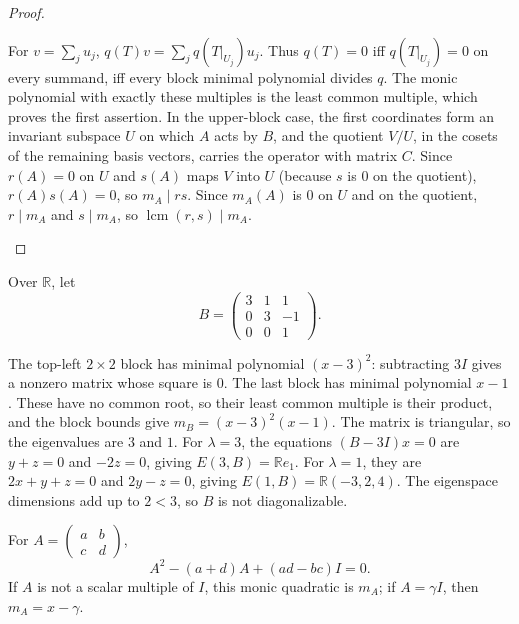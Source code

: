 \begin{prob}\begin{proof}\begin{steps}
\ii For $v=\sum_j u_j$, $q(T)v=\sum_j q(T|_{U_j})u_j$. Thus $q(T)=0$ iff $q(T|_{U_j})=0$ on every summand, iff every block minimal polynomial divides $q$. The monic polynomial with exactly these multiples is the least common multiple, which proves the first assertion.
\ii In the upper-block case, the first coordinates form an invariant subspace $U$ on which $A$ acts by $B$, and the quotient $V/U$, in the cosets of the remaining basis vectors, carries the operator with matrix $C$. Since $r(A)=0$ on $U$ and $s(A)$ maps $V$ into $U$ (because $s$ is $0$ on the quotient), $r(A)s(A)=0$, so $m_A\mid rs$. Since $m_A(A)$ is $0$ on $U$ and on the quotient, $r\mid m_A$ and $s\mid m_A$, so $\operatorname{lcm}(r,s)\mid m_A$.
\end{steps}\end{proof}\end{prob}
\begin{example*}
Over $\mathbb R$, let
\[ B=\begin{pmatrix}3&1&1\\0&3&-1\\0&0&1\end{pmatrix}. \]
\begin{steps}
\ii The top-left $2\times2$ block has minimal polynomial $(x-3)^2$: subtracting $3I$ gives a nonzero matrix whose square is $0$. The last block has minimal polynomial $x-1$. These have no common root, so their least common multiple is their product, and the block bounds give $m_B=(x-3)^2(x-1)$.
\ii The matrix is triangular, so the eigenvalues are $3$ and $1$. For $\lambda=3$, the equations $(B-3I)x=0$ are $y+z=0$ and $-2z=0$, giving $E(3,B)=\mathbb Re_1$. For $\lambda=1$, they are $2x+y+z=0$ and $2y-z=0$, giving $E(1,B)=\mathbb R(-3,2,4)$.
\ii The eigenspace dimensions add up to $2<3$, so $B$ is not diagonalizable.
\end{steps}\end{example*}
\begin{proposition*}
For $A=\left(\begin{smallmatrix}a&b\\c&d\end{smallmatrix}\right)$,
\[A^2-(a+d)A+(ad-bc)I=0.\]
If $A$ is not a scalar multiple of $I$, this monic quadratic is $m_A$; if $A=\gamma I$, then $m_A=x-\gamma$.
\end{proposition*}

